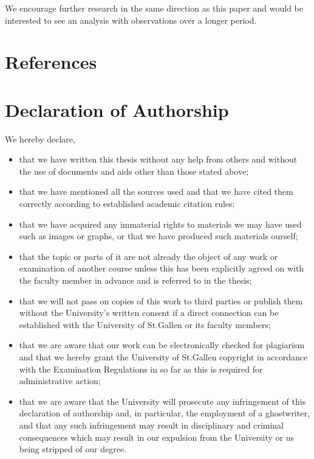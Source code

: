 \documentclass[a4paper,american,12pt]{article}
\begin{document}
\begin{spacing}{1.2}
We encourage further research in the same direction as this paper and would be interested to see an analysis with observations over a longer period. 


\clearpage
		
\end{spacing}

\clearpage

\section{References}
\printbibliography[heading=none]

\clearpage

\section{Declaration of Authorship}
We hereby declare,
\begin{itemize}
\item that we have written this thesis without any help from others and without the use of documents and aids other than those stated above;
\item that we have mentioned all the sources used and that we have cited them correctly according to established academic citation rules;
\item that we have acquired any immaterial rights to materials we may have used such as images or graphs, or that we have produced such materials ourself;
\item that the topic or parts of it are not already the object of any work or examination of another course unless this has been explicitly agreed on with the faculty member in advance and is referred to in the thesis;
\item that we will not pass on copies of this work to third parties or publish them without the University’s written consent if a direct connection can be established with the University of St.Gallen or its faculty members;
\item that we are aware that our work can be electronically checked for plagiarism and that we hereby grant the University of St.Gallen copyright in accordance with the Examination Regulations in so far as this is required for administrative action;
\item that we are aware that the University will prosecute any infringement of this declaration of authorship and, in particular, the employment of a ghostwriter, and that any such infringement may result in disciplinary and criminal consequences which may result in our expulsion from the University or us being stripped of our degree.
\end{itemize}
\end{document}
